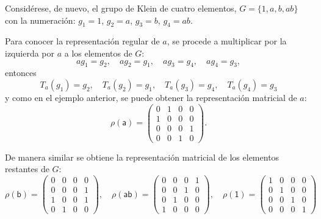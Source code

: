 \begin{ejemplo}
Considérese, de nuevo, el grupo de Klein de cuatro elementos, $G = \{ 1, a, b, ab\}$ con la numeración: $g_1 = 1$, $g_2 = a$, $g_3 = b$, $g_4 = ab$.

Para conocer la representación regular de $a$, se procede a multiplicar por  la izquierda por $a$ a los elementos de $G$:
\begin{equation*} ag_1 = g_2, \quad ag_2 = g_1, \quad ag_3 = g_4, \quad ag_4 = g_3, \end{equation*} entonces 
\begin{equation*} T_a(g_1) = g_2 , \quad T_a(g_2) = g_1, \quad T_a(g_3) = g_4, \quad T_a(g_4) = g_3 \end{equation*} y como en el ejemplo anterior, se puede obtener la representación matricial de $a$:
\begin{equation*}  \mathsf{\rho(a)} = \begin{pmatrix}
0 & 1 & 0 & 0 \\
1 & 0 & 0 & 0 \\
0 & 0 & 0 & 1 \\
0 & 0 & 1 & 0
\end{pmatrix} .\end{equation*}

De manera similar se obtiene la representación matricial de los elementos restantes de $G$:
\begin{equation*} \mathsf{\rho(b)} = \begin{pmatrix}
0 & 0 & 0 & 0\\
0 & 0 & 0 & 1\\
1 & 0 & 0 & 1\\
0 & 1 & 0 & 0
\end{pmatrix}, \quad \mathsf{\rho(ab)} = \begin{pmatrix}
0 & 0 & 0 & 1\\
0 & 0 & 1 & 0\\
0 & 1 & 0 & 0\\
1 & 0 & 0 & 0
\end{pmatrix} , \quad \mathsf{\rho(1)} = \begin{pmatrix}
1 & 0 & 0 & 0\\
0 & 1 & 0 & 0 \\
0 & 0 & 1 & 0\\
0 & 0 & 0 & 1
\end{pmatrix} \end{equation*}

\end{ejemplo}


